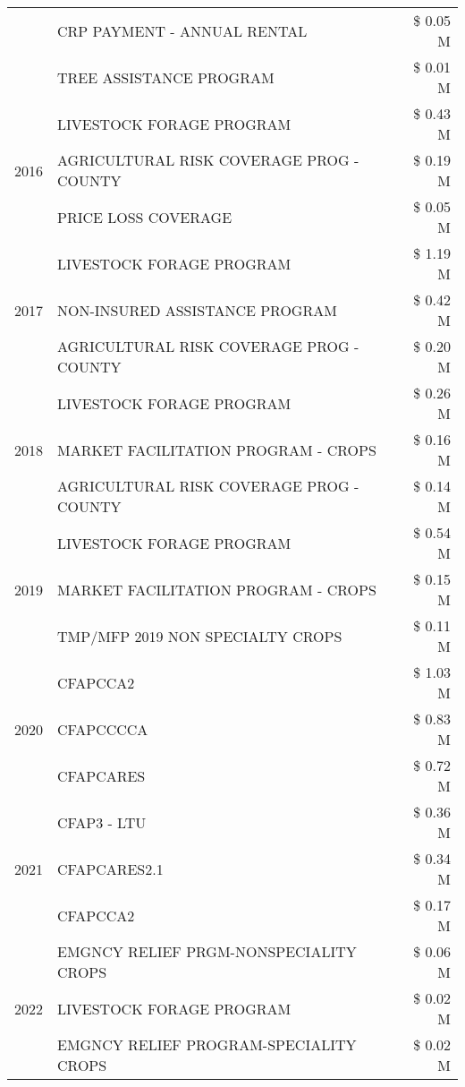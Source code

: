 \begin{tabular}{llr}
 & CRP PAYMENT - ANNUAL RENTAL & \$ 0.05 M \\
 & TREE ASSISTANCE PROGRAM & \$ 0.01 M \\
\cline{1-3}
\multirow[t]{3}{*}{2016} & LIVESTOCK FORAGE PROGRAM & \$ 0.43 M \\
 & AGRICULTURAL RISK COVERAGE PROG - COUNTY & \$ 0.19 M \\
 & PRICE LOSS COVERAGE & \$ 0.05 M \\
\cline{1-3}
\multirow[t]{3}{*}{2017} & LIVESTOCK FORAGE PROGRAM & \$ 1.19 M \\
 & NON-INSURED ASSISTANCE PROGRAM & \$ 0.42 M \\
 & AGRICULTURAL RISK COVERAGE PROG - COUNTY & \$ 0.20 M \\
\cline{1-3}
\multirow[t]{3}{*}{2018} & LIVESTOCK FORAGE PROGRAM & \$ 0.26 M \\
 & MARKET FACILITATION PROGRAM - CROPS & \$ 0.16 M \\
 & AGRICULTURAL RISK COVERAGE PROG - COUNTY & \$ 0.14 M \\
\cline{1-3}
\multirow[t]{3}{*}{2019} & LIVESTOCK FORAGE PROGRAM & \$ 0.54 M \\
 & MARKET FACILITATION PROGRAM - CROPS & \$ 0.15 M \\
 & TMP/MFP 2019 NON SPECIALTY CROPS & \$ 0.11 M \\
\cline{1-3}
\multirow[t]{3}{*}{2020} & CFAPCCA2 & \$ 1.03 M \\
 & CFAPCCCCA & \$ 0.83 M \\
 & CFAPCARES & \$ 0.72 M \\
\cline{1-3}
\multirow[t]{3}{*}{2021} & CFAP3 - LTU & \$ 0.36 M \\
 & CFAPCARES2.1 & \$ 0.34 M \\
 & CFAPCCA2 & \$ 0.17 M \\
\cline{1-3}
\multirow[t]{3}{*}{2022} & EMGNCY RELIEF PRGM-NONSPECIALITY CROPS & \$ 0.06 M \\
 & LIVESTOCK FORAGE PROGRAM & \$ 0.02 M \\
 & EMGNCY RELIEF PROGRAM-SPECIALITY CROPS & \$ 0.02 M \\
\cline{1-3}
\bottomrule
\end{tabular}
